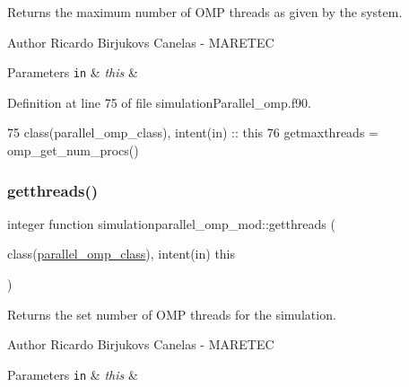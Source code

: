 Returns the maximum number of O\+MP threads as given by the system. 

\begin{DoxyAuthor}{Author}
Ricardo Birjukovs Canelas -\/ M\+A\+R\+E\+T\+EC 
\end{DoxyAuthor}

\begin{DoxyParams}[1]{Parameters}
\mbox{\tt in}  & {\em this} & \\
\hline
\end{DoxyParams}


Definition at line 75 of file simulation\+Parallel\+\_\+omp.\+f90.


\begin{DoxyCode}
75     \textcolor{keywordtype}{class}(parallel\_omp\_class), \textcolor{keywordtype}{intent(in)} :: this
76     getmaxthreads = omp\_get\_num\_procs()
\end{DoxyCode}
\mbox{\label{namespacesimulationparallel__omp__mod_a1f07ce2cf6390af06c3478e6271644e5}} 
\subsubsection{\texorpdfstring{getthreads()}{getthreads()}}
{\footnotesize\ttfamily integer function simulationparallel\+\_\+omp\+\_\+mod\+::getthreads (\begin{DoxyParamCaption}\item[{class(\mbox{\hyperlink{structsimulationparallel__omp__mod_1_1parallel__omp__class}{parallel\+\_\+omp\+\_\+class}}), intent(in)}]{this }\end{DoxyParamCaption})\hspace{0.3cm}{\ttfamily [private]}}



Returns the set number of O\+MP threads for the simulation. 

\begin{DoxyAuthor}{Author}
Ricardo Birjukovs Canelas -\/ M\+A\+R\+E\+T\+EC 
\end{DoxyAuthor}

\begin{DoxyParams}[1]{Parameters}
\mbox{\tt in}  & {\em this} & \\
\hline
\end{DoxyParams}


